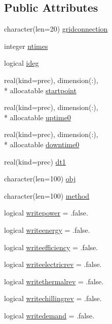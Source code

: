 \subsection*{Public Attributes}
\begin{DoxyCompactItemize}
\item 
character(len=20) \hyperlink{classinputvar_a8488f705094b7c59cf8cb06939fe9a7a}{gridconnection}
\item 
integer \hyperlink{classinputvar_a98d384e0347fb055110c18572dbdb522}{ntimes}
\item 
logical \hyperlink{classinputvar_a62235e6c8b16a98c1aea10ac01e11ac9}{ideg}
\item 
real(kind=prec), dimension(\-:), \\*
allocatable \hyperlink{classinputvar_a3b9acf8a358a0bad89d622cbbbab638f}{startpoint}
\item 
real(kind=prec), dimension(\-:), \\*
allocatable \hyperlink{classinputvar_a3938be0ea72158eee837e2a8c08f29e0}{uptime0}
\item 
real(kind=prec), dimension(\-:), \\*
allocatable \hyperlink{classinputvar_aaab84ab253f188eacce25a200a4ab300}{downtime0}
\item 
real(kind=prec) \hyperlink{classinputvar_a62c9f9492040ef5e03091380533f2c0f}{dt1}
\item 
character(len=100) \hyperlink{classinputvar_ab5d2f467a214e31204c18a24582b81bb}{obj}
\item 
character(len=100) \hyperlink{classinputvar_ad9c1a09ed4bd46ad673997ee302451a4}{method}
\item 
logical \hyperlink{classinputvar_ae3e0dfd2907bb36d0f62715b24f63536}{writepower} = .false.
\item 
logical \hyperlink{classinputvar_ae3e52c17a47fe8dd3e860abff881cfb0}{writeenergy} = .false.
\item 
logical \hyperlink{classinputvar_a7d67f2fa2027e1d60264f442eef9759c}{writeefficiency} = .false.
\item 
logical \hyperlink{classinputvar_afd3b4bc26c396eaba06cecc08717acf1}{writeelectricrev} = .false.
\item 
logical \hyperlink{classinputvar_ae7817d3a1abb7e02fdd1d3f40b45a4e8}{writethermalrev} = .false.
\item 
logical \hyperlink{classinputvar_a2d475a99a1a0efcca534104cf8e2efb5}{writechillingrev} = .false.
\item 
logical \hyperlink{classinputvar_ad6cafaf46b6d0f5bfaeb1ca26ccd0c68}{writedemand} = .false.

\end{DoxyCompactItemize}
